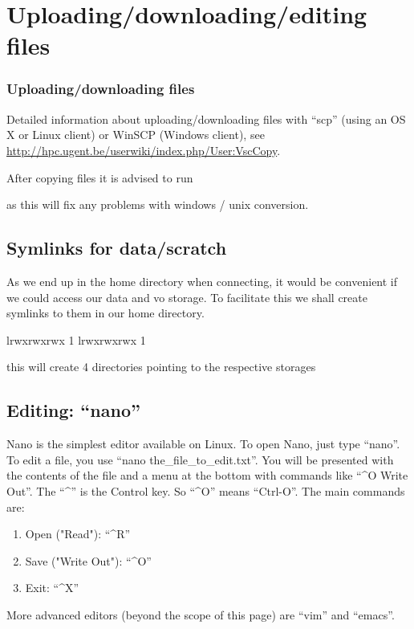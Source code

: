 \chapter{Uploading/downloading/editing files}

\subsection{Uploading/downloading files}

Detailed information about uploading/downloading files with ``scp'' (using an OS
X or Linux client) or WinSCP (Windows client), see
\url{http://hpc.ugent.be/userwiki/index.php/User:VscCopy}.

After copying files it is advised to run

\begin{prompt}
\end{prompt}

as this will fix any problems with windows / unix conversion.

\section{Symlinks for data/scratch}

As we end up in the home directory when connecting, it would be convenient if we
could access our data and vo storage. To facilitate this we shall create
symlinks to them in our home directory.

\begin{prompt}
lrwxrwxrwx 1 %
lrwxrwxrwx 1 %
\end{prompt}

this will create 4 directories pointing to the respective storages

\section{Editing: ``nano''}

Nano is the simplest editor available on Linux. To open Nano, just type
``nano''. To edit a file, you use ``nano the\_file\_to\_edit.txt''. You will
be presented with the contents of the file and a menu at the bottom with
commands like ``\^{}O Write Out''. The ``\^{}'' is the Control key. So ``\^{}O'' means
``Ctrl-O''. The main commands are:

\begin{enumerate}
\item Open ("Read"): ``\^{}R''
\item Save ("Write Out"): ``\^{}O''
\item Exit: ``\^{}X''
\end{enumerate}

More advanced editors (beyond the scope of this page) are ``vim'' and ``emacs''.


